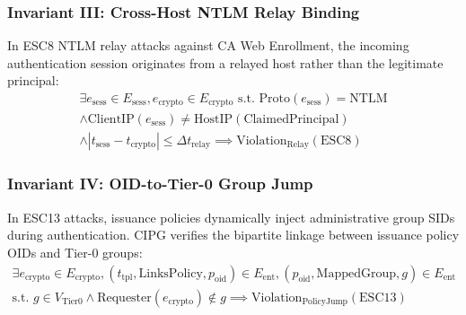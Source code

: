 \subsubsection{Invariant III: Cross-Host NTLM Relay Binding}
In ESC8 NTLM relay attacks against CA Web Enrollment, the incoming authentication session originates from a relayed host rather than the legitimate principal:
\begin{equation}
\begin{aligned}
\exists e_{\text{sess}} \in E_{\text{sess}}, e_{\text{crypto}} \in E_{\text{crypto}} \text{ s.t. } \text{Proto}(e_{\text{sess}}) = \text{NTLM} \\
\wedge \text{ClientIP}(e_{\text{sess}}) \neq \text{HostIP}(\text{ClaimedPrincipal}) \\
\wedge |t_{\text{sess}} - t_{\text{crypto}}| \le \Delta t_{\text{relay}} \implies \text{Violation}_{\text{Relay}}(\text{ESC8})
\end{aligned}
\end{equation}

\subsubsection{Invariant IV: OID-to-Tier-0 Group Jump}
In ESC13 attacks, issuance policies dynamically inject administrative group SIDs during authentication. CIPG verifies the bipartite linkage between issuance policy OIDs and Tier-0 groups:
\begin{equation}
\begin{aligned}
\exists e_{\text{crypto}} \in E_{\text{crypto}}, (t_{\text{tpl}}, \text{LinksPolicy}, p_{\text{oid}}) \in E_{\text{ent}}, (p_{\text{oid}}, \text{MappedGroup}, g) \in E_{\text{ent}} \\
\text{s.t. } g \in V_{\text{Tier0}} \wedge \text{Requester}(e_{\text{crypto}}) \notin g \implies \text{Violation}_{\text{PolicyJump}}(\text{ESC13})
\end{aligned}
\end{equation}

